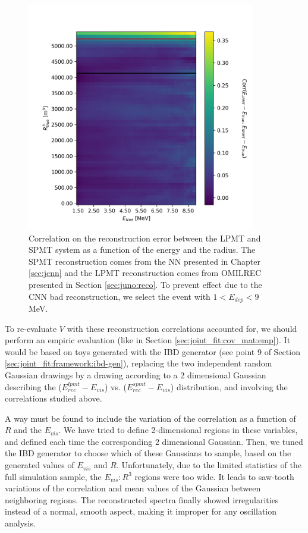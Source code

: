 \documentclass[../main.tex]{subfiles}
\begin{document}
\begin{figure}[ht]
  \centering
  \includegraphics[height=10cm]{images/joint_fit/E_R_corr.png}
  \caption{Correlation on the reconstruction error between the LPMT and SPMT system as a function of  the energy and the radius. The SPMT reconstruction comes from the NN presented in Chapter \ref{sec:jcnn} and the LPMT reconstruction comes from OMILREC presented in Section \ref{sec:juno:reco}. To prevent effect due to the CNN bad reconstruction, we select the event with $1 < E_{dep} < 9$ MeV.}
  \label{fig:joint_fit:empirical_corr:E_R}
\end{figure}

To re-evaluate $V$ with these reconstruction correlations accounted for, we should perform an empiric evaluation (like in Section \ref{sec:joint_fit:cov_mat:emp}).
It would be based on toys generated with the IBD generator (see point 9 of Section \ref{sec:joint_fit:framework:ibd-gen}), replacing the two independent random Gaussian drawings by a drawing according to a 2 dimensional Gaussian describing the ($E^{lpmt}_{rec}-E_{vis}$) vs. ($E^{spmt}_{rec}-E_{vis}$)  distribution, and involving the correlations studied above.

A way must be found to include the variation of the correlation as a function of $R$ and the $E_{vis}$. We have tried to define 2-dimensional regions in these variables, and defined each time the corresponding 2 dimensional Gaussian. Then, we tuned the IBD generator to choose which of these Gaussians to sample, based on the generated values of $E_{vis}$ and $R$. Unfortunately, due to the limited statistics of the full simulation sample, the $E_{vis}:R^3$ regions were too wide. It leads to saw-tooth variations of the correlation and mean values of the Gaussian between neighboring regions. The reconstructed spectra finally showed irregularities instead of a normal, smooth aspect, making it improper for any oscillation analysis.
\end{document}
